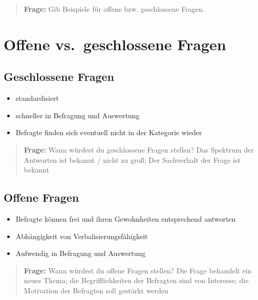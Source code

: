 \documentclass[
]{book}
\providecommand{\tightlist}{%
  \setlength{\itemsep}{0pt}\setlength{\parskip}{0pt}}
\begin{document}
\begin{quote}
\textbf{Frage:} Gib Beispiele für offene bzw. geschlossene Fragen.
\end{quote}

\hypertarget{offene-vs.-geschlossene-fragen}{%
\section{Offene vs.~geschlossene Fragen}\label{offene-vs.-geschlossene-fragen}}

\hypertarget{geschlossene-fragen}{%
\subsection{Geschlossene Fragen}\label{geschlossene-fragen}}

\begin{itemize}
\tightlist
\item
  standardisiert
\item
  schneller in Befragung und Auswertung
\item
  Befragte finden sich eventuell nicht in der Kategorie wieder
\end{itemize}

\begin{quote}
\textbf{Frage:} Wann würdest du geschlossene Fragen stellen?
Das Spektrum der Antworten ist bekannt / nicht zu groß; Der Sachverhalt der Frage ist bekannt
\end{quote}

\hypertarget{offene-fragen}{%
\subsection{Offene Fragen}\label{offene-fragen}}

\begin{itemize}
\tightlist
\item
  Befragte können frei und ihren Gewohnheiten entsprechend antworten
\item
  Abhängigkeit von Verbalisierungsfähigkeit
\item
  Aufwendig in Befragung und Auswertung
\end{itemize}

\begin{quote}
\textbf{Frage:} Wann würdest du offene Fragen stellen?
Die Frage behandelt ein neues Thema; die Begrifflichkeiten der Befragten sind von Interesse; die Motivation der Befragten soll gestärkt werden
\end{quote}
\end{document}
